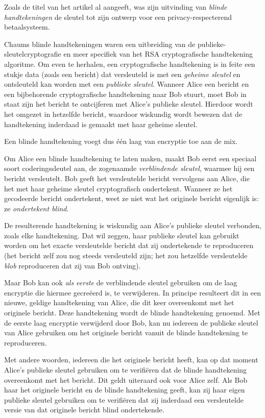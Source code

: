 \documentclass[
  a5paper,
  smalldemyvopaper,11pt,twoside,onecolumn,openright,extrafontsizes,
hidelinks]{memoir}
\begin{document}
Zoals de titel van het artikel al aangeeft, was zijn uitvinding van
\emph{blinde handtekeningen} de sleutel tot zijn ontwerp voor een
privacy-respecterend betaalsysteem.

Chaums blinde handtekeningen waren een uitbreiding van de
publieke-sleutelcryptografie en meer specifiek van het RSA
cryptografische handtekening algoritme. Om even te herhalen, een
cryptografische handtekening is in feite een stukje data (zoals een
bericht) dat versleuteld is met een \emph{geheime sleutel} en
ontsleuteld kan worden met een \emph{publieke sleutel}. Wanneer Alice
een bericht en een bijbehorende cryptografische handtekening naar Bob
stuurt, moet Bob in staat zijn het bericht te ontcijferen met Alice's
publieke sleutel. Hierdoor wordt het omgezet in hetzelfde bericht,
waardoor wiskundig wordt bewezen dat de handtekening inderdaad is
gemaakt met haar geheime sleutel.

Een blinde handtekening voegt dus één laag van encryptie toe aan de mix.

Om Alice een blinde handtekening te laten maken, maakt Bob eerst een
speciaal soort coderingssleutel aan, de zogenaamde \emph{verblindende
sleutel}, waarmee hij een bericht versleutelt. Bob geeft het
versleutelde bericht vervolgens aan Alice, die het met haar geheime
sleutel cryptografisch ondertekent. Wanneer ze het gecodeerde bericht
ondertekent, weet ze niet wat het originele bericht eigenlijk is: ze
\emph{ondertekent blind}.

De resulterende handtekening is wiskundig aan Alice's publieke sleutel
verbonden, zoals elke handtekening. Dat wil zeggen, haar publieke
sleutel kan gebruikt worden om het exacte versleutelde bericht dat zij
ondertekende te reproduceren (het bericht zelf zou nog steeds
versleuteld zijn; het zou hetzelfde versleutelde \emph{blob}
reproduceren dat zij van Bob ontving).

Maar Bob kan ook \emph{als eerste} de verblindende sleutel gebruiken om
de laag encryptie die hiermee gecreëerd is, te verwijderen. In principe
resulteert dit in een nieuwe, geldige handtekening van Alice, die dit
keer overeenkomt met het originele bericht. Deze handtekening wordt de
blinde handtekening genoemd. Met de eerste laag encryptie verwijderd
door Bob, kan nu iedereen de publieke sleutel van Alice gebruiken om het
originele bericht vanuit de blinde handtekening te reproduceren.

Met andere woorden, iedereen die het originele bericht heeft, kan op dat
moment Alice's publieke sleutel gebruiken om te verifiëren dat de blinde
handtekening overeenkomt met het bericht. Dit geldt uiteraard ook voor
Alice zelf. Als Bob haar het originele bericht en de blinde handtekening
geeft, kan zij haar eigen publieke sleutel gebruiken om te verifiëren
dat zij inderdaad een versleutelde versie van dat originele bericht
blind ondertekende.
\end{document}
